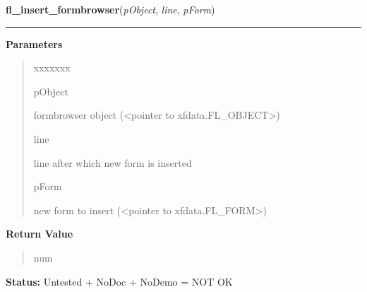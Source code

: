 \hspace{.8\funcindent}\begin{boxedminipage}{\funcwidth}

    \raggedright \textbf{fl\_insert\_formbrowser}(\textit{pObject}, \textit{line}, \textit{pForm})

    \vspace{-1.5ex}

    \rule{\textwidth}{0.5\fboxrule}
\setlength{\parskip}{2ex}
\setlength{\parskip}{1ex}
      \textbf{Parameters}
      \vspace{-1ex}

      \begin{quote}
        \begin{Ventry}{xxxxxxx}

          \item[pObject]

          formbrowser object ({\textless}pointer to 
          xfdata.FL\_OBJECT{\textgreater})

          \item[line]

          line after which new form is inserted

          \item[pForm]

          new form to insert ({\textless}pointer to 
          xfdata.FL\_FORM{\textgreater})

        \end{Ventry}

      \end{quote}

      \textbf{Return Value}
    \vspace{-1ex}

      \begin{quote}
      num

      \end{quote}

\textbf{Status:} Untested + NoDoc + NoDemo = NOT OK



    \end{boxedminipage}

    \label{xformslib:library:fl_get_formbrowser_area}

    \vspace{0.5ex}

